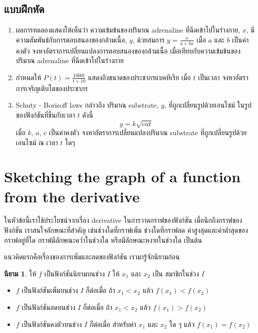 \documentclass[
]{book}
\theoremstyle{definition}
\newtheorem{definition}{นิยาม}[chapter]
\theoremstyle{definition}
\theoremstyle{definition}
\theoremstyle{definition}
\theoremstyle{remark}
\begin{document}
\subsection{แบบฝึกหัด}\label{uxe41uxe1auxe1auxe1duxe01uxe2buxe14-3}

\begin{enumerate}
\def\labelenumi{\arabic{enumi}.}
\item
  ผลการทดลองแสดงให้เห็นว่า ความเข้มข้นของปริมาณ adrenaline ที่ฉีดเข้าไปในร่างกาย,
  \(x\), มีความสัมพันธ์กับการตอบสนองของกล้ามเนื้อ, \(y\), ด้วยสมการ
  \(y=\frac{x}{a+bx}\) เมื่อ \(a\) และ \(b\) เป็นค่าคงตัว
  จงหาอัตราการเปลี่ยนแปลงการตอบสนองของกล้ามเนื้อ เมื่อเทียบกับความเข้มข้นของปริมาณ
  adrenaline ที่ฉีดเข้าไปในร่างกาย
\item
  กำหนดให้ \(\displaystyle P(t)=\frac{1000t}{t+10}\)
  แสดงถึงขนาดของประชากรแบคทีเรีย เมื่อ \(t\) เป็นเวลา
  จงหาอัตราการเจริญเติบโตของประชากร
\item
  Schuty - Borisoff laws กล่าวถึง ปริมาณ substrate, \(y\),
  ที่ถูกเปลี่ยนรูปด้วยเอนไซม์ ในรูปของฟังก์ชันที่ขึ้นกับเวลา \(t\) ดังนี้ \[y=k\sqrt{cat}\]
  เมื่อ \(k\), \(a\), \(c\) เป็นค่าคงตัว จงหาอัตราการเปลี่ยนแปลงปริมาณ substrate
  ที่ถูกเปลี่ยนรูปด้วยเอนไซม์ ณ เวลา \(t\) ใดๆ
\end{enumerate}

\section{Sketching the graph of a function from the derivative}\label{sec-sketch}

ในหัวข้อนี้เราใช้ประโยชน์จากเรื่อง derivative ในการวาดกราฟของฟังก์ชัน
เมื่อนึกถึงกราฟของฟังก์ชัน เราสนใจลักษณะที่สำคัญ เช่นช่วงใดที่กราฟเพิ่ม ช่วงใดที่กราฟลด
ค่าสูงสุดและค่าต่ำสุดของกราฟอยู่ที่ใด กราฟมีลักษณะคว่ำในช่วงใด หรือมีลักษณะหงายในช่วงใด
เป็นต้น

แนวคิดแรกคือเรื่องของการเพิ่มและลดของฟังก์ชัน เรามารู้จักนิยามก่อน

\begin{definition}

ให้ \(f\) เป็นฟังก์ชันนิยามบนช่วง \(I\) ให้ \(x_1\) และ \(x_2\) เป็น สมาชิกในช่วง \(I\)

\begin{itemize}
\item
  \(f\) เป็นฟังก์ชันเพิ่มบนช่วง \(I\) ก็ต่อเมื่อ ถ้า \(x_1 < x_2\) แล้ว \(f(x_1) < f(x_2)\)
\item
  \(f\) เป็นฟังก์ชันลดบนช่วง \(I\) ก็ต่อเมื่อ ถ้า \(x_1 < x_2\) แล้ว \(f(x_1) > f(x_2)\)
\item
  \(f\) เป็นฟังก์ชันคงตัวบนช่วง \(I\) ก็ต่อเมื่อ สำหรับค่า \(x_1\) และ \(x_2\) ใด ๆ แล้ว
  \(f(x_1) = f(x_2)\)
\end{itemize}

\end{definition}
\end{document}
